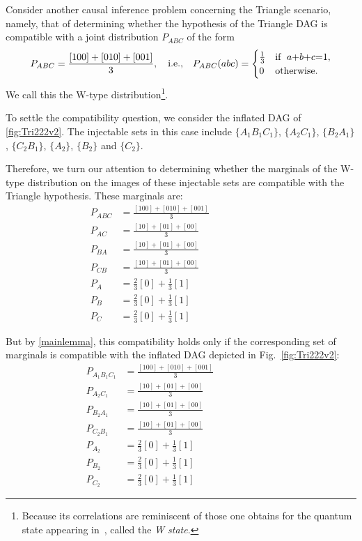 Consider another causal inference problem concerning the Triangle scenario, namely, that of determining whether the hypothesis of the Triangle DAG is compatible with a joint distribution 
$P_{A B C}$ of the form
\begin{align}\label{eq:wdistribution1}
P_{A B C}=\frac{[100]+[010]+[001]}{3},\quad\text{i.e.,}\quad P_{A B C}(a b c)=\begin{cases}\tfrac{1}{3}&\text{if }\; a\mathord{+}b\mathord{+}c\mathord{=} 1, \\ 0&\text{otherwise}.\end{cases}
\end{align}
We call this the W-type distribution\footnote{Because its correlations are reminiscent of those one obtains for the quantum state appearing in~\cite{3Qubits2Ways}, called the \emph{W state}.}. 

To settle the compatibility question, we consider the inflated DAG of \cref{fig:Tri222v2}.  The injectable sets in this case include $\{A_1 B_1 C_1\}$, $\{A_2 C_1\}$, $\{B_2 A_1\}$, $\{C_2 B_1\}$,  $\{A_2\}$, $\{B_2\}$ and $\{C_2\}$. 

Therefore, we turn our attention to determining whether the marginals of the W-type distribution on the images of these injectable sets are compatible with the Triangle hypothesis.  These marginals are:
\begin{align}
P_{A B C}&= \frac{[100]+[010]+[001]}{3} &&&&&&&&\label{V4}\\
P_{A C}&= \frac{[10]+[01]+[00]}{3} &&&&&&&&\label{V1}\\
P_{B A}&=\frac{[10]+[01]+[00]}{3} &&&&&&&&\label{V2}\\
P_{C B}&= \frac{[10]+[01]+[00]}{3} &&&&&&&&\label{V3}\\
P_{A}&= \frac{2}{3}[0] + \frac{1}{3}[1] &&&&&&&&\label{V5}\\
P_{B}&=\frac{2}{3}[0] + \frac{1}{3}[1]  &&&&&&&&\label{V6}\\
P_{C}&= \frac{2}{3}[0] + \frac{1}{3}[1]  &&&&&&&&\label{V7}
\end{align}

But by \cref{mainlemma}, this compatibility holds only if the corresponding set of marginals is compatible with the inflated DAG depicted in Fig.~\ref{fig:Tri222v2}:
\begin{align}
P_{A_1 B_1 C_1}&= \frac{[100]+[010]+[001]}{3} &&&&&&&&\label{W4}\\
P_{A_2 C_1}&= \frac{[10]+[01]+[00]}{3} &&&&&&&&\label{W1}\\
P_{B_2 A_1}&=\frac{[10]+[01]+[00]}{3} &&&&&&&&\label{W2}\\
P_{C_2 B_1}&= \frac{[10]+[01]+[00]}{3} &&&&&&&&\label{W3}\\
P_{A_2}&= \frac{2}{3}[0] + \frac{1}{3}[1] &&&&&&&&\label{W5}\\
P_{B_2}&=\frac{2}{3}[0] + \frac{1}{3}[1]  &&&&&&&&\label{W6}\\
P_{C_2}&= \frac{2}{3}[0] + \frac{1}{3}[1]  &&&&&&&&\label{W7}
\end{align}

